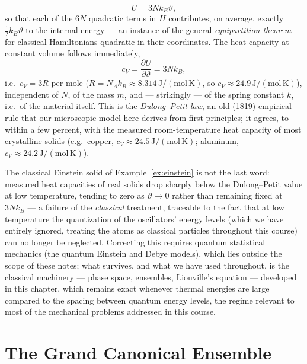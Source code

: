 \begin{example}
\begin{equation}
		U = 3N k_B\vartheta,
	\end{equation}
	so that each of the $6N$ quadratic terms in $H$ contributes, on average, exactly $\tfrac12 k_B\vartheta$ to the internal energy --- an instance of the general \textit{equipartition theorem} for classical Hamiltonians quadratic in their coordinates. The heat capacity at constant volume follows immediately,
	\begin{equation}\label{dulongpetit}
		c_V = \frac{\partial U}{\partial \vartheta} = 3N k_B,
	\end{equation}
	i.e.\ $c_V = 3R$ per mole ($R=N_A k_B\approx8.314\,\mathrm{J/(mol\,K)}$, so $c_V\approx24.9\,\mathrm{J/(mol\,K)}$), independent of $N$, of the mass $m$, and --- strikingly --- of the spring constant $k$, i.e.\ of the material itself. This is the \textit{Dulong--Petit law}, an old (1819) empirical rule that our microscopic model here derives from first principles; it agrees, to within a few percent, with the measured room-temperature heat capacity of most crystalline solids (e.g.\ copper, $c_V\approx24.5\,\mathrm{J/(mol\,K)}$; aluminum, $c_V\approx24.2\,\mathrm{J/(mol\,K)}$).
\end{example}

\begin{remark}
	The classical Einstein solid of Example~\ref{ex:einstein} is not the last word: measured heat capacities of real solids drop sharply below the Dulong--Petit value at low temperature, tending to zero as $\vartheta\to0$ rather than remaining fixed at $3Nk_B$ --- a failure of the \textit{classical} treatment, traceable to the fact that at low temperature the quantization of the oscillators' energy levels (which we have entirely ignored, treating the atoms as classical particles throughout this course) can no longer be neglected. Correcting this requires quantum statistical mechanics (the quantum Einstein and Debye models), which lies outside the scope of these notes; what survives, and what we have used throughout, is the classical machinery --- phase space, ensembles, Liouville's equation --- developed in this chapter, which remains exact whenever thermal energies are large compared to the spacing between quantum energy levels, the regime relevant to most of the mechanical problems addressed in this course.
\end{remark}

\section{The Grand Canonical Ensemble}

